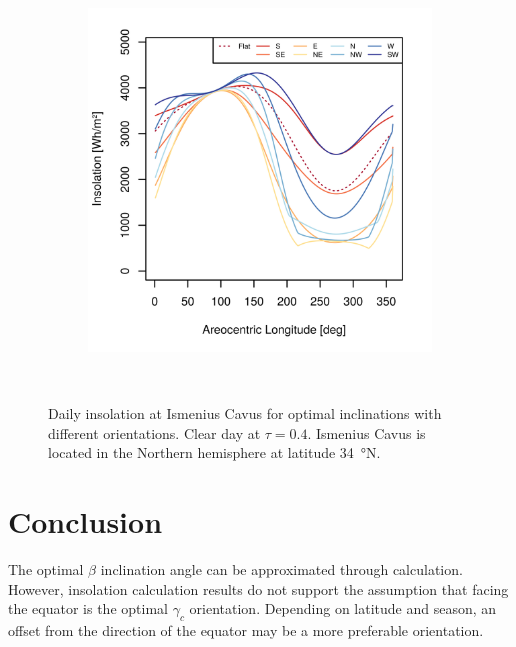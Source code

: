 \begin{figure}[h]
\begin{subfigure}[t]{\subfigureWidth}
            \includegraphics[height=\graphicsHeight]{sections/appendix/optimal-angles/plots/ismenius-cavus-tau-04-and-beta-optimal-based-on-solar-insolation.png}
            \label{fig:sub:optimal-angles-ismenius-cavus-based-on-insolation}
    \end{subfigure}\\[0.8ex]
    \caption[Daily insolation at Ismenius Cavus for optimal inclinations with different orientations]
    {Daily insolation at Ismenius Cavus for optimal inclinations with different orientations. Clear day at $\tau=0.4$. Ismenius Cavus is located in the Northern hemisphere at latitude \SI{34}{\degree}N.}
    \label{fig:plot:optimal-angles-ismenius-cavus}
\vspace{-2ex}
\end{figure}

\section{Conclusion}
The optimal $\beta$ inclination angle can be approximated through calculation. However, insolation calculation results do not support the assumption that facing the equator is the optimal $\gamma_c$ orientation. Depending on latitude and season, an offset from the direction of the equator may be a more preferable orientation.
